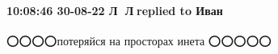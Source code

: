  
 
 
 
 

\paragraph{10:08:46 30-08-22 Л🦊 Л🦊replied to Иван}
⭕⭕⭕⭕потеряйся на просторах инета ⭕⭕⭕⭕⭕
